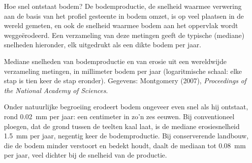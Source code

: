Hoe snel ontstaat bodem? De bodemproductie, de snelheid waarmee verwering aan de
basis van het profiel gesteente in bodem omzet, is op veel plaatsen in de wereld
gemeten, en ook de snelheid waarmee bodem aan het oppervlak wordt weggeërodeerd.
Een verzameling van deze metingen geeft de typische (mediane) snelheden
hieronder, elk uitgedrukt als een dikte bodem per jaar.

\begin{omfigure}

{\small Mediane snelheden van bodemproductie en van erosie uit een wereldwijde
verzameling metingen, in millimeter bodem per jaar (logaritmische schaal: elke
stap is tien keer de stap eronder).
Gegevens: Montgomery (2007), \emph{Proceedings of the National Academy of Sciences}.}
\end{omfigure}

Onder natuurlijke begroeiing erodeert bodem ongeveer even snel als hij ontstaat,
rond \qty{0.02}{mm} per jaar: een centimeter in zo'n zes eeuwen. Bij
conventioneel ploegen, dat de grond tussen de teelten kaal laat, is de mediane
erosiesnelheid \qty{1.5}{mm} per jaar, negentig keer de bodemproductie. Bij
conserverende landbouw, die de bodem minder verstoort en bedekt houdt, daalt de
mediaan tot \qty{0.08}{mm} per jaar, veel dichter bij de snelheid van de
productie.

